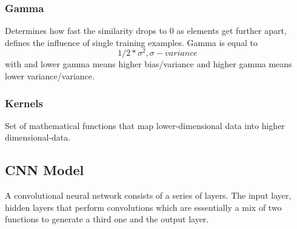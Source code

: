 \documentclass[conference]{IEEEtran}
\begin{document}
\subsubsection{Gamma}
Determines how fast the similarity drops to 0 as elements get further apart, defines the influence of single training examples. Gamma is equal to \[1/2*\sigma^2, \sigma-variance\] with and lower gamma means higher bias/variance and higher gamma means lower variance/variance.\cite{b9}\\

\subsubsection{Kernels}
Set of mathematical functions that map lower-dimensional data into higher dimensional-data.\\

\subsection{CNN Model}
A convolutional neural network consists of a series of layers. The input layer, hidden layers that perform convolutions which are essentially a mix of two functions to generate a third one and the output layer.\\
 
\end{document}
